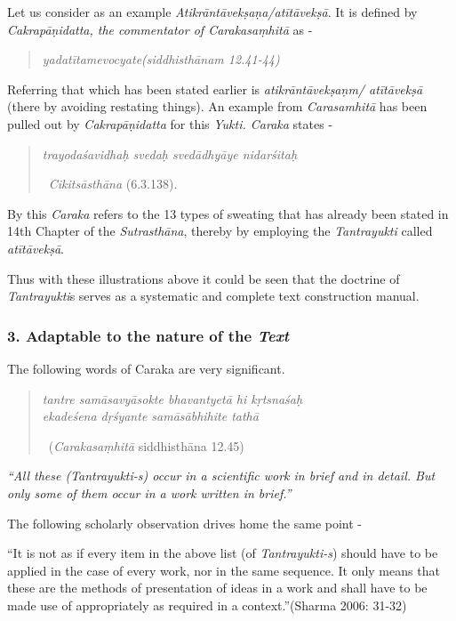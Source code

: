 Let us consider as an example \textit{Atikrāntāvekṣaṇa/atītāvekṣā}. It is defined by \textit{Cakrapāṇidatta, the commentator of Carakasaṃhitā} as -

\begin{verse}
\textit{yadatītamevocyate}\hfill \textit{(siddhisthānam 12.41-44)}
\end{verse}

Referring that which has been stated earlier is \textit{atikrāntāvekṣaṇm/ atītāvekṣā} (there by avoiding restating things). An example from \textit{Carasamhitā} has been pulled out by \textit{Cakrapāṇidatta} for this \textit{Yukti. Caraka} states -

\begin{verse}
\textit{trayodaśavidhaḥ svedaḥ svedādhyāye nidarśitaḥ}

~\hfill \textit{Cikitsāsthāna} (6.3.138).
\end{verse}

By this \textit{Caraka} refers to the 13 types of sweating that has already been stated in 14th Chapter of the \textit{Sutrasthāna}, thereby by employing the \textit{Tantrayukti} called\textit{ atītāvekṣā}.

Thus with these illustrations above it could be seen that the doctrine of \textit{Tantrayukti}s serves as a systematic and complete text construction manual.


\subsubsection*{3. Adaptable to the nature of the \textit{Text}}

The following words of Caraka are very significant.

\begin{verse}
\textit{tantre samāsavyāsokte bhavantyetā hi kṛtsnaśaḥ }\\\textit{ekadeśena dṛśyante samāsābhihite tathā  }

~\hfill (\textit{Carakasaṃhitā} siddhisthāna 12.45)
\end{verse}

\textit{“All these (Tantrayukti-s) occur in a scientific work in brief and in detail. But only some of them occur in a work written in brief.”}

The following scholarly observation drives home the same point -

“It is not as if every item in the above list (of \textit{Tantrayukti-s}) should have to be applied in the case of every work, nor in the same sequence. It only means that these are the methods of presentation of ideas in a work and shall have to be made use of appropriately as required in a context.”\hfill (Sharma 2006: 31-32)

